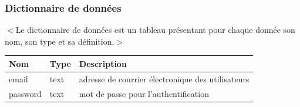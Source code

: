 \documentclass{scrreprt}
\begin{document}
\subsubsection{Dictionnaire de données}
$<$Le dictionnaire de données est un tableau présentant pour chaque donnée son nom, son type et sa définition.$>$

\begin{center}
\begin{tabular}{ |l|l|l| } 
 \hline
 Nom & Type  & Description \\ 
 \hline\hline
 email & text & adresse de courrier électronique des utilisateurs \\ 
 \hline
 password & text & mot de passe pour l'authentification \\ 
 \hline
\end{tabular}
\end{center}



\end{document}
